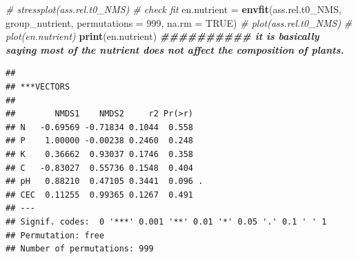 \documentclass[
]{article}
\newenvironment{Shaded}{\begin{snugshade}}{\end{snugshade}}
\newcommand{\AttributeTok}[1]{\textcolor[rgb]{0.13,0.29,0.53}{#1}}
\newcommand{\CommentTok}[1]{\textcolor[rgb]{0.56,0.35,0.01}{\textit{#1}}}
\newcommand{\ConstantTok}[1]{\textcolor[rgb]{0.56,0.35,0.01}{#1}}
\newcommand{\DecValTok}[1]{\textcolor[rgb]{0.00,0.00,0.81}{#1}}
\newcommand{\DocumentationTok}[1]{\textcolor[rgb]{0.56,0.35,0.01}{\textbf{\textit{#1}}}}
\newcommand{\FunctionTok}[1]{\textcolor[rgb]{0.13,0.29,0.53}{\textbf{#1}}}
\newcommand{\NormalTok}[1]{#1}
\newcommand{\OtherTok}[1]{\textcolor[rgb]{0.56,0.35,0.01}{#1}}
\begin{document}
\begin{Shaded}
\begin{Highlighting}[]
\CommentTok{\# stressplot(ass.rel.t0\_NMS) \# check fit}
\NormalTok{en.nutrient }\OtherTok{=} \FunctionTok{envfit}\NormalTok{(ass.rel.t0\_NMS, group\_nutrient, }\AttributeTok{permutations =} \DecValTok{999}\NormalTok{, }\AttributeTok{na.rm =} \ConstantTok{TRUE}\NormalTok{)}
\CommentTok{\# plot(ass.rel.t0\_NMS) }
\CommentTok{\# plot(en.nutrient)}
\FunctionTok{print}\NormalTok{(en.nutrient) }\DocumentationTok{\#\#\#\#\#\#\#\#\#\# it is basically saying most of the nutrient does not affect the composition of plants.}
\end{Highlighting}
\end{Shaded}

\begin{verbatim}
## 
## ***VECTORS
## 
##        NMDS1    NMDS2     r2 Pr(>r)  
## N   -0.69569 -0.71834 0.1044  0.558  
## P    1.00000 -0.00238 0.2460  0.248  
## K    0.36662  0.93037 0.1746  0.358  
## C   -0.83027  0.55736 0.1548  0.404  
## pH   0.88210  0.47105 0.3441  0.096 .
## CEC  0.11255  0.99365 0.1267  0.491  
## ---
## Signif. codes:  0 '***' 0.001 '**' 0.01 '*' 0.05 '.' 0.1 ' ' 1
## Permutation: free
## Number of permutations: 999
\end{verbatim}
\end{document}
